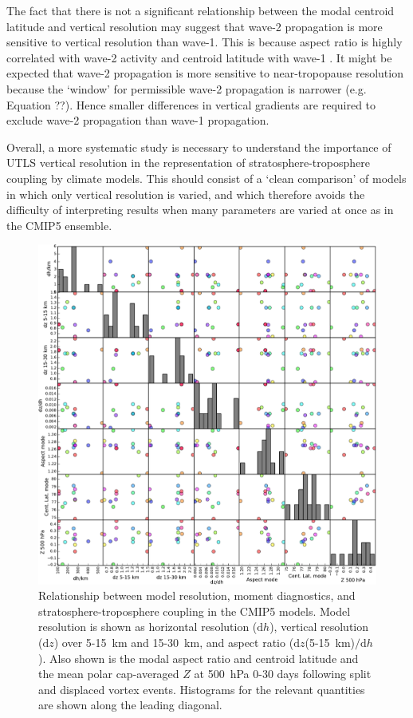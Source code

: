The fact that there is not a significant relationship between the modal centroid
latitude and vertical resolution may suggest that wave-2 propagation is more
sensitive to vertical resolution than wave-1. This is because aspect ratio is
highly correlated with wave-2 activity and centroid latitude with wave-1
\citep{Waugh1999}. It might be expected that wave-2 propagation is more
sensitive to near-tropopause resolution because the `window' for permissible
wave-2 propagation is narrower (e.g. Equation ??). Hence smaller differences in
vertical gradients are required to exclude wave-2 propagation than wave-1
propagation. 

Overall, a more systematic study is necessary to understand the importance of
UTLS vertical resolution in the representation of stratosphere-troposphere
coupling by climate models. This should consist of a `clean comparison' of
models in which only vertical resolution is varied, and which therefore avoids
the difficulty of interpreting results when many parameters are varied at once
as in the CMIP5 ensemble.



\begin{figure}
 \centering
 \noindent\includegraphics[width=\textwidth]{figures/chapter-models/scatter_matrix.pdf}
 \caption[Relationship between model resolution and moment diagnostics in the
 CMIP5 models.]{Relationship between model resolution, moment diagnostics, and
   stratosphere-troposphere coupling in the CMIP5 models. Model resolution is
   shown as horizontal resolution ($\mathrm{d}h$), vertical resolution
   ($\mathrm{d}z$) over 5-15~km and 15-30~km, and aspect ratio
   ($\mathrm{d}z$(5-15~km)$ / \mathrm{d}h$). Also shown is the modal aspect ratio
   and centroid latitude and the mean polar cap-averaged $Z$ at 500~hPa 0-30
   days following split and displaced vortex events. Histograms for the relevant
   quantities are shown along the leading diagonal.}
 \label{fig:scatter_matrix}
\end{figure}

